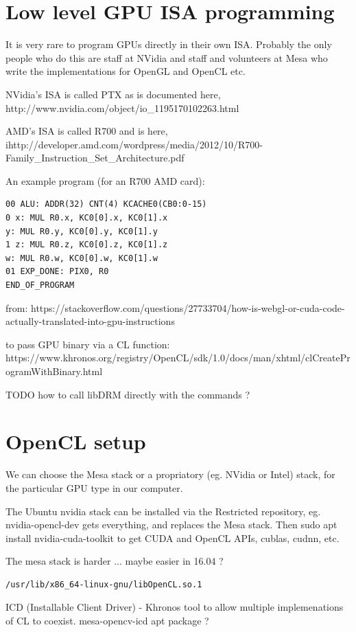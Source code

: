 \documentclass[oneside,english]{scrbook}
\begin{document}
\section{Low level GPU ISA programming}

It is very rare to program GPUs directly in their own ISA.  Probably the only people who do this are staff at NVidia and staff and volunteers at Mesa who write the implementations for OpenGL and OpenCL etc.

NVidia's ISA is called PTX as is documented here,
http://www.nvidia.com/object/io_1195170102263.html

AMD's ISA is called R700 and is here,
ihttp://developer.amd.com/wordpress/media/2012/10/R700-Family_Instruction_Set_Architecture.pdf

An example program (for an R700 AMD card):

\begin{lstlisting}
00 ALU: ADDR(32) CNT(4) KCACHE0(CB0:0-15)   
0 x: MUL R0.x, KC0[0].x, KC0[1].x    
y: MUL R0.y, KC0[0].y, KC0[1].y
1 z: MUL R0.z, KC0[0].z, KC0[1].z
w: MUL R0.w, KC0[0].w, KC0[1].w
01 EXP_DONE: PIX0, R0
END_OF_PROGRAM
\end{lstlisting}

from:
https://stackoverflow.com/questions/27733704/how-is-webgl-or-cuda-code-actually-translated-into-gpu-instructions

to pass GPU binary via a CL function:
https://www.khronos.org/registry/OpenCL/sdk/1.0/docs/man/xhtml/clCreateProgramWithBinary.html


TODO how to call libDRM directly with the commands ?
\section{OpenCL setup}
We can choose the Mesa stack or a propriatory (eg. NVidia or Intel) stack, for the particular GPU type in our computer.

The Ubuntu nvidia stack can be installed via the Restricted repository, eg. nvidia-opencl-dev gets everything, and replaces the Mesa stack.  Then sudo apt install nvidia-cuda-toolkit to get CUDA and OpenCL APIs, cublas, cudnn, etc.

The mesa stack is harder ...  maybe easier in 16.04 ?
\begin{lstlisting}
/usr/lib/x86_64-linux-gnu/libOpenCL.so.1
\end{lstlisting}
ICD (Installable Client Driver) - Khronos tool to allow multiple implemenations of CL to coexist.
mesa-opencv-icd  apt package ?
\end{document}
